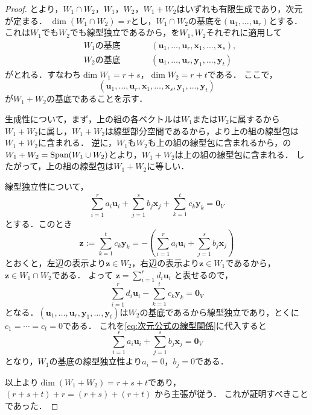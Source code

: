 \begin{tleftbar}
\begin{proof}
  とより，$W_1 \cap W_2$，$W_1$，$W_2$，$W_1+W_2$はいずれも有限生成であり，次元が定まる．
  $\dim(W_1 \cap W_2) = r$とし，$W_1 \cap W_2$の基底を$(\bm{u}_1, \dots, \bm{u}_r)$とする．
  これは$W_1$でも$W_2$でも線型独立であるから，を$W_1,W_2$それぞれに適用して
  \[
    \begin{aligned}
      &\text{$W_1$の基底} \qquad
      &&(\bm{u}_1, \dots, \bm{u}_r, \bm{x}_1, \dots, \bm{x}_s),\\
      &\text{$W_2$の基底}
      &&(\bm{u}_1, \dots, \bm{u}_r, \bm{y}_1, \dots, \bm{y}_t)
    \end{aligned}
  \]
  がとれる．すなわち$\dim W_1 = r + s$，$\dim W_2 = r + t$である．
  ここで，
  \[
    (\bm{u}_1, \dots, \bm{u}_r, \bm{x}_1, \dots, \bm{x}_s, \bm{y}_1, \dots, \bm{y}_t)
  \]
  が$W_1 + W_2$の基底であることを示す．

  生成性について，まず，上の組の各ベクトルは$W_1$または$W_2$に属するから$W_1 + W_2$に属し，$W_1 + W_2$は線型部分空間であるから，より上の組の線型包は$W_1 + W_2$に含まれる．
  逆に，$W_1$も$W_2$も上の組の線型包に含まれるから，の$W_1 + W_2 = \operatorname{Span}(W_1 \cup W_2)$とより，$W_1 + W_2$は上の組の線型包に含まれる．
  したがって，上の組の線型包は$W_1 + W_2$に等しい．

  線型独立性について，
  \begin{equation}
    \sum_{i=1}^{r} a_i \bm{u}_i + \sum_{j=1}^{s} b_j \bm{x}_j + \sum_{k=1}^{t} c_k \bm{y}_k = \bm{0}_V
    \label{eq:次元公式の線型関係}
  \end{equation}
  とする．このとき
  \[
    \bm{z} := \sum_{k=1}^{t} c_k \bm{y}_k
    = -\left( \sum_{i=1}^{r} a_i \bm{u}_i + \sum_{j=1}^{s} b_j \bm{x}_j \right)
  \]
  とおくと，左辺の表示より$\bm{z} \in W_2$，右辺の表示より$\bm{z} \in W_1$であるから，$\bm{z} \in W_1 \cap W_2$である．
  よって
  $\bm{z} = \sum_{i=1}^{r} d_i \bm{u}_i$
  と表せるので，
  \[
    \sum_{i=1}^{r} d_i \bm{u}_i - \sum_{k=1}^{t} c_k \bm{y}_k = \bm{0}_V
  \]
  となる．$(\bm{u}_1, \dots, \bm{u}_r, \bm{y}_1, \dots, \bm{y}_t)$は$W_2$の基底であるから線型独立であり，とくに$c_1 = \cdots = c_t = 0$である．
  これを\eqref{eq:次元公式の線型関係}に代入すると
  \[
    \sum_{i=1}^{r} a_i \bm{u}_i + \sum_{j=1}^{s} b_j \bm{x}_j = \bm{0}_V
  \]
  となり，$W_1$の基底の線型独立性より$a_i = 0$，$b_j = 0$である．

  以上より$\dim(W_1 + W_2) = r + s + t$であり，
  $(r + s + t) + r = (r + s) + (r + t)$
  から主張が従う．
  これが証明すべきことであった．
\end{proof}
\end{tleftbar}


